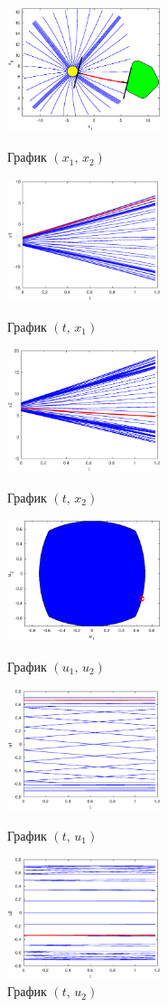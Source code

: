 \documentclass[11pt]{article}
\begin{document}
\begin{figure}[h]
\begin{multicols}{3}
	\hfill
	\includegraphics[width=45mm]{1xx.eps}
	\hfill
	\caption{График $(x_1, \, x_2)$}
	\hfill
	\includegraphics[width=45mm]{1tx1.eps}
	\hfill
	\caption{График $(t, \, x_1)$}
    \hfill
	\includegraphics[width=45mm]{1tx2.eps}
	\hfill
	\caption{График $(t, \, x_2)$}
\end{multicols}

\begin{multicols}{3}
	\hfill
	\includegraphics[width=45mm]{1uu.eps}
	\hfill
	\caption{График $(u_1, \, u_2)$}
	\hfill
	\includegraphics[width=45mm]{1tu1.eps}
	\hfill
	\caption{График $(t, \, u_1)$}
    \hfill
	\includegraphics[width=45mm]{1tu2.eps}
	\hfill
	\caption{График $(t, \, u_2)$}
\end{multicols}


\end{figure}
\end{document}
